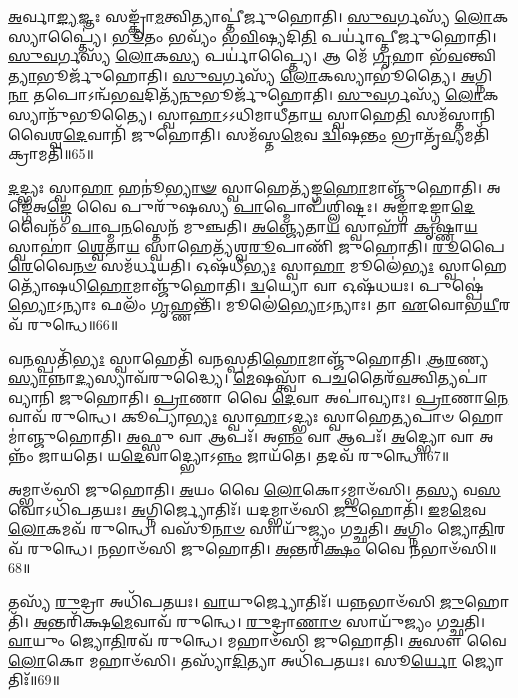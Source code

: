 \-\ul{𑌅}\-𑌰𑍍𑌵𑌾\-\ul{𑌙𑍍𑌯}\-𑌜𑍍𑌞𑌃 𑌸𑌙𑍍𑌕𑍍𑌰𑌾᳴\-\ul{𑌮}\-𑌤𑍍𑌵𑌿𑌤𑍍𑌯𑌾𑌪𑍍𑌤𑍀॑𑌰𑍍𑌜𑍁𑌹𑍋𑌤𑌿।
\-\ul{𑌸𑍁}\-\-\ul{𑌵}\-𑌰𑍍𑌗𑌸𑍍𑌯᳴ \ul{𑌲𑍋}\-𑌕𑌸𑍍𑌯𑌾𑌪𑍍𑌤𑍍𑌯𑍈॑।
\-\ul{𑌭𑍂}\-𑌤𑌂 𑌭𑌵𑍍𑌯𑌂᳴ 𑌭\-\ul{𑌵𑌿}\-𑌷𑍍𑌯𑌦𑌿\-\ul{𑌤𑌿} 𑌪𑌰𑍍𑌯𑌾॑𑌪𑍍𑌤𑍀𑌰𑍍𑌜𑍁𑌹𑍋𑌤𑌿।
\-\ul{𑌸𑍁}\-\-\ul{𑌵}\-𑌰𑍍𑌗𑌸𑍍𑌯᳴ \ul{𑌲𑍋}\-𑌕\-\ul{𑌸𑍍𑌯} 𑌪𑌰𑍍𑌯𑌾॑𑌪𑍍𑌤𑍍𑌯𑍈।
𑌆 𑌮𑍇᳴ \ul{𑌗𑍃}\-𑌹𑌾 𑌭᳴\-\ul{𑌵}\-𑌨𑍍𑌤𑍍𑌵𑌿\-\ul{𑌤𑍍𑌯𑌾}\-𑌭𑍂𑌰𑍍𑌜𑍁᳴𑌹𑍋𑌤𑌿।
\-\ul{𑌸𑍁}\-\-\ul{𑌵}\-𑌰𑍍𑌗𑌸𑍍𑌯᳴ \ul{𑌲𑍋}\-𑌕𑌸𑍍𑌯𑌾𑌭𑍂॑𑌤𑍍𑌯𑍈।
\-\ul{𑌅}\-𑌗𑍍𑌨𑌿\-\ul{𑌨𑌾} 𑌤𑌪𑍋\-𑌽𑌨𑍍𑌵᳴𑌭\-\ul{𑌵}\-𑌦𑌿𑌤𑍍𑌯᳴\-\ul{𑌨𑍁}\-𑌭𑍂𑌰𑍍𑌜𑍁᳴𑌹𑍋𑌤𑌿।
\-\ul{𑌸𑍁}\-\-\ul{𑌵}\-𑌰𑍍𑌗𑌸𑍍𑌯᳴ \ul{𑌲𑍋}\-𑌕𑌸𑍍𑌯𑌾𑌨𑍁᳴𑌭𑍂𑌤𑍍𑌯𑍈।
𑌸𑍍𑌵𑌾\-\ul{𑌹𑌾}\-\-𑌽𑌽𑌧𑌿𑌮𑌾𑌧𑍀᳴𑌤𑌾\-\ul{𑌯} 𑌸𑍍𑌵𑌾𑌹𑍇\-\ul{𑌤𑌿} 𑌸𑌮᳴𑌸𑍍𑌤𑌾𑌨𑌿 𑌵𑍈𑌶𑍍𑌵\-\ul{𑌦𑍇}\-𑌵𑌾𑌨𑌿᳴ 𑌜𑍁𑌹𑍋𑌤𑌿।
𑌸𑌮᳴𑌸𑍍𑌤\-\ul{𑌮𑍇}\-𑌵 \ul{𑌦𑍍𑌵𑌿}\-𑌷\-\ul{𑌨𑍍𑌤𑌂} 𑌭𑍍𑌰𑌾𑌤𑍃᳴\-\ul{𑌵𑍍𑌯}\-𑌮𑌤𑌿᳴ 𑌕𑍍𑌰𑌾𑌮𑌤𑌿॥65॥

\-\ul{𑌦}\-𑌦𑍍𑌭𑍍𑌯𑌃 𑌸𑍍𑌵𑌾\-\ul{𑌹𑌾} 𑌹𑌨𑍂॑\-\ul{𑌭𑍍𑌯𑌾}\-\-\ul{𑍟} 𑌸𑍍𑌵𑌾𑌹𑍇𑌤𑍍𑌯᳴𑌙𑍍𑌗\-\ul{𑌹𑍋}\-𑌮𑌾𑌞𑍍𑌜𑍁᳴𑌹𑍋𑌤𑌿।
𑌅𑌙𑍍𑌗𑍇᳴𑌅\-\ul{𑌙𑍍𑌗𑍇} 𑌵𑍈 𑌪𑍁𑌰𑍁᳴𑌷𑌸𑍍𑌯 \ul{𑌪𑌾}\-𑌪𑍍𑌮𑍋𑌪᳴𑌶𑍍𑌲𑌿𑌷𑍍𑌟𑌃।
𑌅𑌙𑍍𑌗𑌾᳴𑌦𑌙𑍍𑌗𑌾\-\ul{𑌦𑍇}\-𑌵𑍈𑌨𑌂᳴ \ul{𑌪𑌾}\-𑌪𑍍𑌮\-\ul{𑌨}\-𑌸𑍍𑌤𑍇𑌨᳴ 𑌮𑍁𑌞𑍍𑌚𑌤𑌿।
\-\ul{𑌅}\-\-\ul{𑌞𑍍𑌜𑍍𑌯𑍇}\-𑌤𑌾\-\ul{𑌯} 𑌸𑍍𑌵𑌾𑌹𑌾᳴ \ul{𑌕𑍃}\-𑌷𑍍𑌣𑌾\-\ul{𑌯} 𑌸𑍍𑌵𑌾𑌹𑌾॑ \ul{𑌶𑍍𑌵𑍇}\-𑌤𑌾\-\ul{𑌯} 𑌸𑍍𑌵𑌾𑌹𑍇𑌤𑍍𑌯᳴𑌶𑍍𑌵\-\ul{𑌰𑍂}\-𑌪𑌾𑌣𑌿᳴ 𑌜𑍁𑌹𑍋𑌤𑌿।
\-\ul{𑌰𑍂}\-𑌪𑍈\-\ul{𑌰𑍇}\-𑌵𑍈\-\ul{𑌨}\-\-\ul{𑍞} 𑌸𑌮᳴𑌰𑍍𑌧𑌯𑌤𑌿।
𑌓𑌷᳴𑌧𑍀\-\ul{𑌭𑍍𑌯𑌃} 𑌸𑍍𑌵𑌾\-\ul{𑌹𑌾} 𑌮𑍂𑌲𑍇॑\-\ul{𑌭𑍍𑌯𑌃} 𑌸𑍍𑌵𑌾𑌹𑍇𑌤𑍍𑌯𑍋᳴𑌷𑌧𑌿\-\ul{𑌹𑍋}\-𑌮𑌾𑌞𑍍𑌜𑍁᳴𑌹𑍋𑌤𑌿।
\-\ul{𑌦𑍍𑌵}\-𑌯𑍍𑌯𑍋 𑌵𑌾 𑌓𑌷᳴𑌧𑌯𑌃।
𑌪𑍁𑌷𑍍𑌪𑍇॑\-\ul{𑌭𑍍𑌯𑍋}\-\-𑌽𑌨𑍍𑌯𑌾𑌃 𑌫𑌲𑌂᳴ \ul{𑌗𑍃}\-𑌹𑍍𑌣𑌨𑍍𑌤𑌿᳴।
𑌮𑍂𑌲𑍇॑\-\ul{𑌭𑍍𑌯𑍋}\-\-𑌽𑌨𑍍𑌯𑌾𑌃।
𑌤𑌾 \ul{𑌏}\-𑌵𑍋𑌭\-\ul{𑌯𑍀}\-𑌰𑌵᳴ 𑌰𑍁𑌨𑍍𑌧𑍇॥66॥

𑌵\-\ul{𑌨}\-𑌸𑍍𑌪𑌤𑌿᳴\-\ul{𑌭𑍍𑌯𑌃} 𑌸𑍍𑌵𑌾𑌹𑍇𑌤𑌿᳴ 𑌵𑌨𑌸𑍍𑌪𑌤𑌿\-\ul{𑌹𑍋}\-𑌮𑌾𑌞𑍍𑌜𑍁᳴𑌹𑍋𑌤𑌿।
\-\ul{𑌆}\-\-\ul{𑌰}\-𑌣𑍍𑌯\-\ul{𑌸𑍍𑌯𑌾}\-\-𑌨𑍍𑌨𑌾\-\ul{𑌦𑍍𑌯}\-𑌸𑍍𑌯𑌾𑌵᳴𑌰𑍁𑌦𑍍𑌧𑍍𑌯𑍈।
\-\ul{𑌮𑍇}\-𑌷𑌸𑍍𑌤𑍍𑌵𑌾᳴ 𑌪\-\ul{𑌚}\-𑌤𑍈𑌰᳴\-\ul{𑌵}\-𑌤𑍍𑌵𑌿𑌤𑍍𑌯𑌪𑌾॑𑌵𑍍𑌯𑌾𑌨𑌿 𑌜𑍁𑌹𑍋𑌤𑌿।
\-\ul{𑌪𑍍𑌰𑌾}\-𑌣𑌾 𑌵𑍈 \ul{𑌦𑍇}\-𑌵𑌾 𑌅𑌪𑌾॑𑌵𑍍𑌯𑌾𑌃।
\-\ul{𑌪𑍍𑌰𑌾}\-𑌣𑌾\-\ul{𑌨𑍇}\-𑌵𑌾𑌵᳴ 𑌰𑍁𑌨𑍍𑌧𑍇।
𑌕𑍂𑌪𑍍𑌯𑌾॑\-\ul{𑌭𑍍𑌯𑌃} 𑌸𑍍𑌵𑌾\-\ul{𑌹𑌾}\-𑌽𑌦𑍍𑌭𑍍𑌯𑌃 𑌸𑍍𑌵𑌾𑌹𑍇\-\ul{𑌤𑍍𑌯}\-𑌪𑌾𑍞 𑌹𑍋𑌮𑌾॑𑌞𑍍𑌜𑍁𑌹𑍋𑌤𑌿।
\-\ul{𑌅}\-𑌫𑍍𑌸𑍁 𑌵𑌾 𑌆𑌪𑌃᳴।
𑌅\-\ul{𑌨𑍍𑌨𑌂} 𑌵𑌾 𑌆𑌪𑌃᳴।
\-\ul{𑌅}\-𑌦𑍍𑌭𑍍𑌯𑍋 𑌵𑌾 𑌅𑌨𑍍𑌨𑌂᳴ 𑌜𑌾𑌯𑌤𑍇।
𑌯\-\ul{𑌦𑍇}\-𑌵𑌾𑌦𑍍𑌭𑍍𑌯𑍋\-𑌽\-\ul{𑌨𑍍𑌨𑌂} 𑌜𑌾𑌯᳴𑌤𑍇।
𑌤𑌦𑌵᳴ 𑌰𑍁𑌨𑍍𑌧𑍇॥67॥\anuvakamend[\-\ul{𑌪𑍂}\-\-\ul{𑌰𑍍𑌵}\-\-\ul{𑌦𑍀}\-𑌕𑍍𑌷𑌾 𑌜𑍁᳴𑌹𑍋\-\ul{𑌤𑌿} 𑌪𑍂𑌰𑍍𑌵᳴ \ul{𑌏}\-𑌵 \ul{𑌦𑍍𑌵𑌿}\-𑌷\-\ul{𑌨𑍍𑌤𑌂} 𑌭𑍍𑌰𑌾𑌤𑍃᳴\-\ul{𑌵𑍍𑌯}\-𑌮𑌤𑌿᳴ 𑌕𑍍𑌰𑌾\-\ul{𑌮}\-𑌤𑍍𑌯𑌨᳴𑌨𑍍𑌤𑌰𑌿𑌤𑍍𑌯𑍈 𑌕𑍍𑌰𑌾𑌮𑌤𑌿 𑌰𑍁\-\ul{𑌨𑍍𑌧𑍇} 𑌜𑌾𑌯᳴\-\ul{𑌤} 𑌏𑌕𑌂᳴ 𑌚]

𑌅𑌮𑍍𑌭𑌾𑍞᳴𑌸𑌿 𑌜𑍁𑌹𑍋𑌤𑌿।
\-\ul{𑌅}\-𑌯𑌂 𑌵𑍈 \ul{𑌲𑍋}\-𑌕𑍋\-𑌽𑌮𑍍𑌭𑌾𑍞᳴𑌸𑌿।
𑌤\-\ul{𑌸𑍍𑌯} 𑌵\-\ul{𑌸}\-𑌵𑍋\-𑌽𑌧𑌿᳴𑌪𑌤𑌯𑌃।
\-\ul{𑌅}\-𑌗𑍍𑌨𑌿𑌰𑍍𑌜𑍍𑌯𑍋𑌤𑌿𑌃᳴।
𑌯𑌦𑌮𑍍𑌭𑌾𑍞᳴𑌸𑌿 \ul{𑌜𑍁}\-𑌹𑍋𑌤𑌿᳴।
\-\ul{𑌇}\-𑌮\-\ul{𑌮𑍇}\-𑌵 \ul{𑌲𑍋}\-𑌕𑌮𑌵᳴ 𑌰𑍁𑌨𑍍𑌧𑍇।
𑌵𑌸𑍂᳴\-\ul{𑌨𑌾}\-\-\ul{𑍞} 𑌸𑌾𑌯𑍁᳴𑌜𑍍𑌯𑌂 𑌗𑌚𑍍𑌛𑌤𑌿।
\-\ul{𑌅}\-𑌗𑍍𑌨𑌿𑌂 𑌜𑍍𑌯𑍋\-\ul{𑌤𑌿}\-𑌰𑌵᳴ 𑌰𑍁𑌨𑍍𑌧𑍇।
𑌨𑌭𑌾𑍞᳴𑌸𑌿 𑌜𑍁𑌹𑍋𑌤𑌿।
\-\ul{𑌅}\-𑌨𑍍𑌤𑌰𑌿᳴\-\ul{𑌕𑍍𑌷𑌂} 𑌵𑍈 𑌨𑌭𑌾𑍞᳴𑌸𑌿॥68॥

𑌤𑌸𑍍𑌯᳴ \ul{𑌰𑍁}\-𑌦𑍍𑌰𑌾 𑌅𑌧𑌿᳴𑌪𑌤𑌯𑌃।
\-\ul{𑌵𑌾}\-𑌯𑍁𑌰𑍍𑌜𑍍𑌯𑍋𑌤𑌿𑌃᳴।
𑌯𑌨𑍍𑌨𑌭𑌾𑍞᳴𑌸𑌿 \ul{𑌜𑍁}\-𑌹𑍋𑌤𑌿᳴।
\-\ul{𑌅}\-𑌨𑍍𑌤𑌰𑌿᳴𑌕𑍍𑌷\-\ul{𑌮𑍇}\-𑌵𑌾𑌵᳴ 𑌰𑍁𑌨𑍍𑌧𑍇।
\-\ul{𑌰𑍁}\-𑌦𑍍𑌰𑌾\-\ul{𑌣𑌾}\-\-\ul{𑍞} 𑌸𑌾𑌯𑍁᳴𑌜𑍍𑌯𑌂 𑌗𑌚𑍍𑌛𑌤𑌿।
\-\ul{𑌵𑌾}\-𑌯𑍁𑌂 𑌜𑍍𑌯𑍋\-\ul{𑌤𑌿}\-𑌰𑌵᳴ 𑌰𑍁𑌨𑍍𑌧𑍇।
𑌮𑌹𑌾𑍞᳴𑌸𑌿 𑌜𑍁𑌹𑍋𑌤𑌿।
\-\ul{𑌅}\-𑌸𑍗 𑌵𑍈 \ul{𑌲𑍋}\-𑌕𑍋 𑌮𑌹𑌾𑍞᳴𑌸𑌿।
𑌤𑌸𑍍𑌯𑌾᳴\-\ul{𑌦𑌿}\-𑌤𑍍𑌯𑌾 𑌅𑌧𑌿᳴𑌪𑌤𑌯𑌃।
𑌸𑍂\-\ul{𑌰𑍍𑌯𑍋} 𑌜𑍍𑌯𑍋𑌤𑌿𑌃᳴॥69॥

